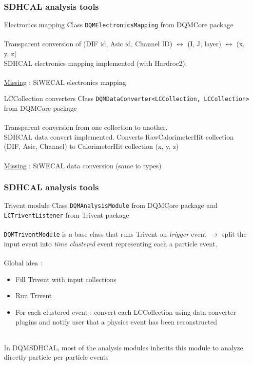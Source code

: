 \documentclass[8pt]{beamer}
\begin{document}
    
  \begin{frame}[containsverbatim]
    \frametitle{\secname}
    \frametitle{SDHCAL analysis tools}
    \begin{block}{Electronics mapping}
      Class \verb|DQMElectronicsMapping| from DQMCore package \\~\\
      Transparent conversion of (DIF id, Asic id, Channel ID) $\leftrightarrow$ (I, J, layer) $\leftrightarrow$ (x, y, z) \\
      SDHCAL electronics mapping implemented (with Hardroc2). \\~\\
      \underline{Missing} : SiWECAL electronics mapping
    \end{block}
    \begin{block}{LCCollection converters}
      Class \verb|DQMDataConverter<LCCollection, LCCollection>| from DQMCore package \\~\\
      Transparent conversion from one collection to another. \\
      SDHCAL data convert implemented. Converts RawCalorimeterHit collection (DIF, Asic, Channel) to CalorimeterHit collection (x, y, z) \\~\\
      \underline{Missing} : SiWECAL data conversion (same io types) \\
    \end{block}
  \end{frame}
  
  
  \begin{frame}[containsverbatim]
    \frametitle{\secname}
    \frametitle{SDHCAL analysis tools}
    \begin{block}{Trivent module}
      Class \verb|DQMAnalysisModule| from DQMCore package and \verb|LCTriventListener| from Trivent package\\~\\
      \verb|DQMTriventModule| is a base class that runs Trivent on \textit{trigger} event $\rightarrow$ split the input event into \textit{time clustered} event representing each a particle event. \\~\\
      Global idea :
      \begin{itemize}
        \item Fill Trivent with input collections
        \item Run Trivent
        \item For each clustered event : convert each LCCollection using data converter plugins and notify user that a physics event has been reconstructed
      \end{itemize}
      ~ \\
      In DQMSDHCAL, most of the analysis modules inherits this module to analyze directly particle per particle events 
    \end{block}
  \end{frame}
  
  
\end{document}
